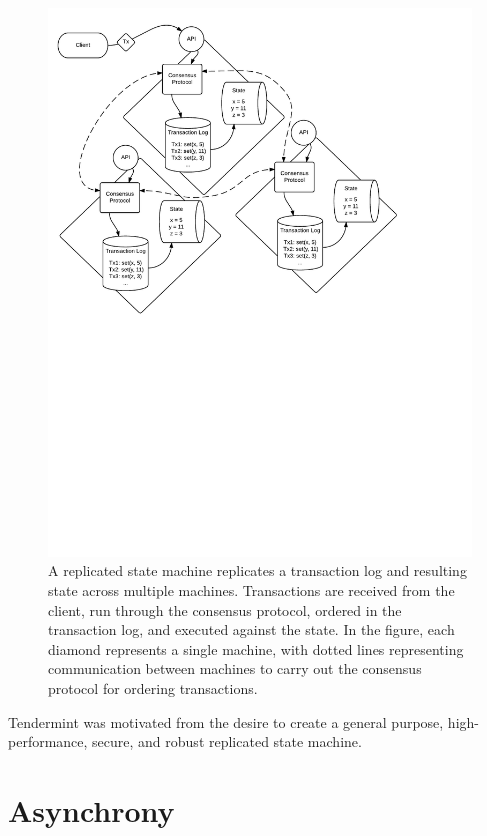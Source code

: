 \begin{figure}[]
	\includegraphics[width=\linewidth,height=\textheight,keepaspectratio]{figures/diagrams/state_machine.pdf}
    	\centering
	\caption[Overview of replicated state machine architecture]{
A replicated state machine replicates a transaction log and resulting state across multiple machines. 
Transactions are received from the client, 
run through the consensus protocol, 
ordered in the transaction log,
and executed against the state. 
In the figure, each diamond represents a single machine, 
with dotted lines representing communication between machines to carry out the consensus protocol for ordering transactions.}
	\label{fig:replicated_state_machine}
\end{figure}

Tendermint was motivated from the desire to create a general purpose, high-performance, secure, and robust replicated state machine.

\section{Asynchrony}

